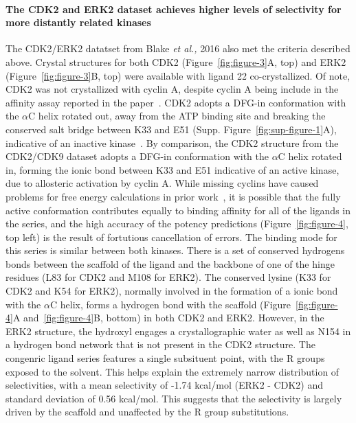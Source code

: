\documentclass[9pt,lineno]{elife-modified} %
\begin{document}
\paragraph{The CDK2 and ERK2 dataset achieves higher levels of selectivity for more distantly related kinases}
The CDK2/ERK2 datatset from Blake \emph{et al.,} 2016 also met the criteria described above. Crystal structures for both CDK2 (Figure~\ref{fig:figure-3}A, top) and ERK2 (Figure~\ref{fig:figure-3}B, top) were available with ligand 22 co-crystallized. Of note, CDK2 was not crystallized with cyclin A, despite cyclin A being include in the affinity assay reported in the paper~\citep{Blake2016-su}. CDK2 adopts a DFG-in conformation with the $\alpha$C helix rotated out, away from the ATP binding site and breaking the conserved salt bridge between K33 and E51 (Supp. Figure~\ref{fig:sup-figure-1}A), indicative of an inactive kinase~\citep{Huse2002-ml,Hari:2013dp,TREIBER2013745}. By comparison, the CDK2 structure from the CDK2/CDK9 dataset adopts a DFG-in conformation with the $\alpha$C helix rotated in, forming the ionic bond between K33 and E51 indicative of an active kinase, due to allosteric activation by cyclin A. While missing cyclins have caused problems for free energy calculations in prior work~, it is possible that the fully active conformation contributes equally to binding affinity for all of the ligands in the series, and the high accuracy of the potency predictions (Figure~\ref{fig:figure-4}, top left) is the result of fortutious cancellation of errors. The binding mode for this series is similar between both kinases. There is a set of conserved hydrogens bonds between the scaffold of the ligand and the backbone of one of the hinge residues (L83 for CDK2 and M108 for ERK2). The conserved lysine (K33 for CDK2 and K54 for ERK2), normally involved in the formation of a ionic bond with the $\alpha$C helix, forms a hydrogen bond with the scaffold (Figure~\ref{fig:figure-4}A and~\ref{fig:figure-4}B, bottom) in both CDK2 and ERK2. However, in the ERK2 structure, the hydroxyl engages a crystallographic water as well as N154 in a hydrogen bond network that is not present in the CDK2 structure. 
The congenric ligand series features a single subsituent point, with the R groups exposed to the solvent. This helps explain the extremely narrow distribution of selectivities, with a mean selectivity of -1.74 kcal/mol (ERK2 - CDK2) and standard deviation of 0.56 kcal/mol. This suggests that the selectivity is largely driven by the scaffold and unaffected by the R group substitutions.
\end{document}
